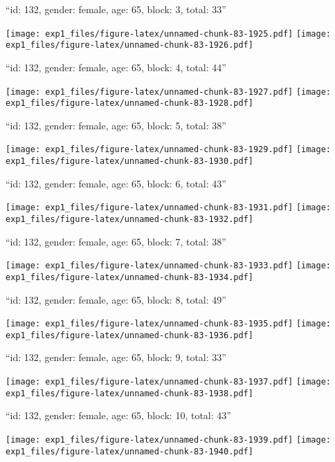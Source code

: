 \documentclass[11pt,,]{article}
\begin{document}
\newpage
[1] 

``id: 132, gender: female, age: 65, block: 3, total: 33''

\texttt{[image: exp1\_files/figure-latex/unnamed-chunk-83-1925.pdf]}
\texttt{[image: exp1\_files/figure-latex/unnamed-chunk-83-1926.pdf]}

\newpage
[1] 

``id: 132, gender: female, age: 65, block: 4, total: 44''

\texttt{[image: exp1\_files/figure-latex/unnamed-chunk-83-1927.pdf]}
\texttt{[image: exp1\_files/figure-latex/unnamed-chunk-83-1928.pdf]}

\newpage
[1] 

``id: 132, gender: female, age: 65, block: 5, total: 38''

\texttt{[image: exp1\_files/figure-latex/unnamed-chunk-83-1929.pdf]}
\texttt{[image: exp1\_files/figure-latex/unnamed-chunk-83-1930.pdf]}

\newpage
[1] 

``id: 132, gender: female, age: 65, block: 6, total: 43''

\texttt{[image: exp1\_files/figure-latex/unnamed-chunk-83-1931.pdf]}
\texttt{[image: exp1\_files/figure-latex/unnamed-chunk-83-1932.pdf]}

\newpage
[1] 

``id: 132, gender: female, age: 65, block: 7, total: 38''

\texttt{[image: exp1\_files/figure-latex/unnamed-chunk-83-1933.pdf]}
\texttt{[image: exp1\_files/figure-latex/unnamed-chunk-83-1934.pdf]}

\newpage
[1] 

``id: 132, gender: female, age: 65, block: 8, total: 49''

\texttt{[image: exp1\_files/figure-latex/unnamed-chunk-83-1935.pdf]}
\texttt{[image: exp1\_files/figure-latex/unnamed-chunk-83-1936.pdf]}

\newpage
[1] 

``id: 132, gender: female, age: 65, block: 9, total: 33''

\texttt{[image: exp1\_files/figure-latex/unnamed-chunk-83-1937.pdf]}
\texttt{[image: exp1\_files/figure-latex/unnamed-chunk-83-1938.pdf]}

\newpage
[1] 

``id: 132, gender: female, age: 65, block: 10, total: 43''

\texttt{[image: exp1\_files/figure-latex/unnamed-chunk-83-1939.pdf]}
\texttt{[image: exp1\_files/figure-latex/unnamed-chunk-83-1940.pdf]}
\end{document}
